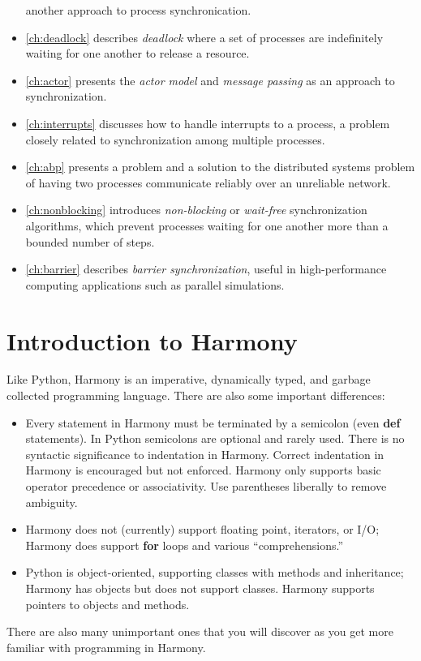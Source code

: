 \documentclass{report}
\begin{document}
\begin{itemize}
another approach to process synchronication.
\item \autoref{ch:deadlock} describes \emph{deadlock}
where a set of processes are indefinitely waiting for one another to
release a resource.
\item \autoref{ch:actor} presents the \emph{actor model}
and \emph{message passing} as an approach to synchronization.
\item \autoref{ch:interrupts} discusses how to handle interrupts to a process,
a problem closely related to synchronization among multiple processes.
\item \autoref{ch:abp} presents a problem and a solution to the distributed
systems problem of having two processes communicate reliably over an unreliable
network.
\item \autoref{ch:nonblocking} introduces \emph{non-blocking} or
\emph{wait-free} synchronization algorithms,
which prevent processes waiting for one another more than a bounded number of
steps.
\item \autoref{ch:barrier} describes \emph{barrier synchronization},
useful in high-performance computing applications such as parallel simulations.
\end{itemize}

\chapter{Introduction to Harmony}
\label{ch:harmonyintro}

Like Python, Harmony is an imperative,
dynamically typed, and garbage collected programming language.
There are also some important differences:
\begin{itemize}
\item Every statement in Harmony must be terminated by a semicolon
(even \textbf{def} statements).
In Python semicolons are optional and rarely used.
There is no syntactic significance to indentation in Harmony.
Correct indentation in Harmony is encouraged but not enforced.
Harmony only supports basic operator precedence or associativity.
Use parentheses liberally to remove ambiguity.
\item Harmony does not (currently) support floating point, iterators, or I/O;
Harmony does support \textbf{for} loops and various ``comprehensions.''
\item Python is object-oriented, supporting classes with methods and
inheritance; Harmony has objects but does not support classes.  Harmony supports
pointers to objects and methods.
\end{itemize}
There are also many unimportant ones that you will discover as
you get more familiar with programming in Harmony.
\end{document}
